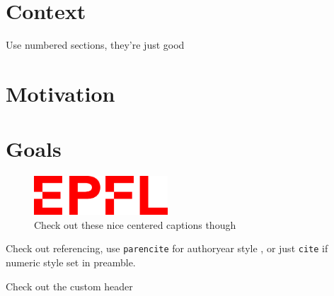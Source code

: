 \section{Context}

Use numbered sections, they're just good

\section{Motivation}



\section{Goals}

\begin{figure} %
    \centering
    \includegraphics[width=5cm]{Images/epfl.png}
    \caption{Check out these nice centered captions though}
    \label{fig:my_label}
\end{figure}

Check out referencing, use \texttt{parencite} for authoryear style \parencite{reflabel}, or just \texttt{cite} if numeric style set in preamble. \lipsum[4] 

\lipsum[5] 

\lipsum[6] 

\lipsum[7]

\begin{invsummary}
Check out the custom header
\end{invsummary}
